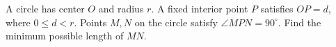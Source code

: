 A circle has center $O$ and radius $r$. A fixed interior point $P$ satisfies $OP=d$, where $0\le d<r$. Points $M,N$ on the circle satisfy $\angle MPN=90^\circ$. Find the minimum possible length of $MN$.
